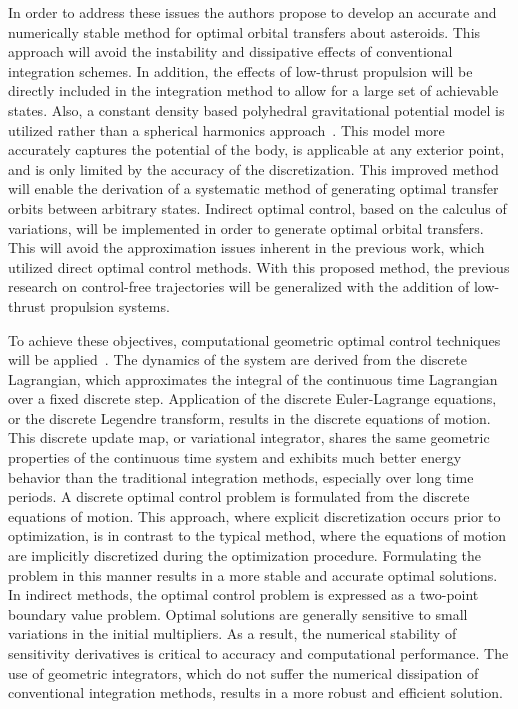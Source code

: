 \documentclass[letterpaper, preprint, paper,11pt]{AAS}	%
\begin{document}
In order to address these issues the authors propose to develop an accurate and numerically stable method for optimal orbital transfers about asteroids.
This approach will avoid the instability and dissipative effects of conventional integration schemes.
In addition, the effects of low-thrust propulsion will be directly included in the integration method to allow for a large set of achievable states.
Also, a constant density based polyhedral gravitational potential model is utilized rather than a spherical harmonics approach~\cite{werner1994}.
This model more accurately captures the potential of the body, is applicable at any exterior point, and is only limited by the accuracy of the discretization.
This improved method will enable the derivation of a systematic method of generating optimal transfer orbits between arbitrary states.
Indirect optimal control, based on the calculus of variations, will be implemented in order to generate optimal orbital transfers.
This will avoid the approximation issues inherent in the previous work, which utilized direct optimal control methods.
With this proposed method, the previous research on control-free trajectories will be generalized with the addition of low-thrust propulsion systems.

To achieve these objectives, computational geometric optimal control techniques will be applied~\cite{fahnestock2006}. 
The dynamics of the system are derived from the discrete Lagrangian, which approximates the integral of the continuous time Lagrangian over a fixed discrete step.
Application of the discrete Euler-Lagrange equations, or the discrete Legendre transform, results in the discrete equations of motion.
This discrete update map, or variational integrator, shares the same geometric properties of the continuous time system and exhibits much better energy behavior than the traditional integration methods, especially over long time periods.
A discrete optimal control problem is formulated from the discrete equations of motion.
This approach, where explicit discretization occurs prior to optimization, is in contrast to the typical method, where the equations of motion are implicitly discretized during the optimization procedure.
Formulating the problem in this manner results in a more stable and accurate optimal solutions. 
In indirect methods, the optimal control problem is expressed as a two-point boundary value problem.
Optimal solutions are generally sensitive to small variations in the initial multipliers.
As a result, the numerical stability of sensitivity derivatives is critical to accuracy and computational performance. 
The use of geometric integrators, which do not suffer the numerical dissipation of conventional integration methods, results in a more robust and efficient solution.
\end{document}
